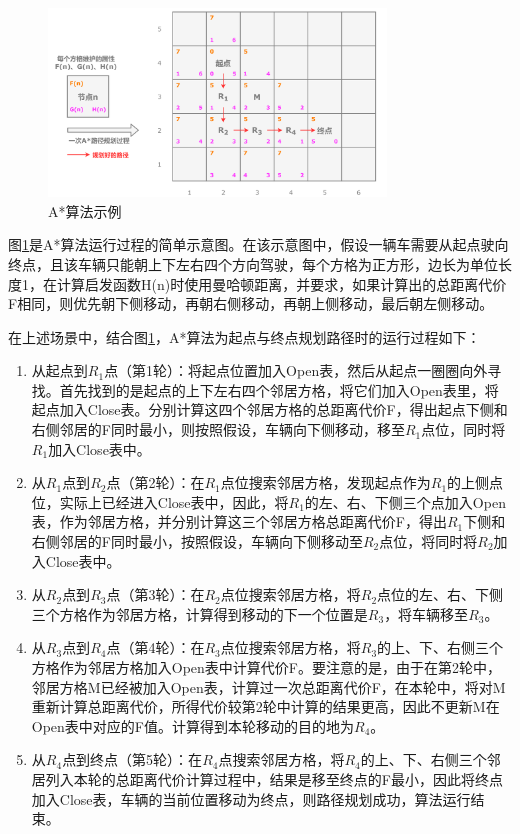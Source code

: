 \begin{figure}[!ht]
  \centering
  \includegraphics[width=0.8\textwidth]{undergraduate-thesis/images/Astar_Fn.png}
  \caption{A*算法示例}
  \label{AstarFn} %
\end{figure}

图\ref{AstarFn}是A*算法运行过程的简单示意图。在该示意图中，假设一辆车需要从起点驶向终点，且该车辆只能朝上下左右四个方向驾驶，每个方格为正方形，边长为单位长度1，在计算启发函数H(n)时使用曼哈顿距离，并要求，如果计算出的总距离代价F相同，则优先朝下侧移动，再朝右侧移动，再朝上侧移动，最后朝左侧移动。

在上述场景中，结合图\ref{AstarFn}，A*算法为起点与终点规划路径时的运行过程如下：

\begin{enumerate}
    \item 从起点到$R_1$点（第1轮）：将起点位置加入Open表，然后从起点一圈圈向外寻找。首先找到的是起点的上下左右四个邻居方格，将它们加入Open表里，将起点加入Close表。分别计算这四个邻居方格的总距离代价F，得出起点下侧和右侧邻居的F同时最小，则按照假设，车辆向下侧移动，移至$R_1$点位，同时将$R_1$加入Close表中。
    \item 从$R_1$点到$R_2$点（第2轮）：在$R_1$点位搜索邻居方格，发现起点作为$R_1$的上侧点位，实际上已经进入Close表中，因此，将$R_1$的左、右、下侧三个点加入Open表，作为邻居方格，并分别计算这三个邻居方格总距离代价F，得出$R_1$下侧和右侧邻居的F同时最小，按照假设，车辆向下侧移动至$R_2$点位，将同时将$R_2$加入Close表中。
    \item 从$R_2$点到$R_3$点（第3轮）：在$R_2$点位搜索邻居方格，将$R_2$点位的左、右、下侧三个方格作为邻居方格，计算得到移动的下一个位置是$R_3$，将车辆移至$R_3$。
    \item 从$R_3$点到$R_4$点（第4轮）：在$R_3$点位搜索邻居方格，将$R_3$的上、下、右侧三个方格作为邻居方格加入Open表中计算代价F。要注意的是，由于在第2轮中，邻居方格M已经被加入Open表，计算过一次总距离代价F，在本轮中，将对M重新计算总距离代价，所得代价较第2轮中计算的结果更高，因此不更新M在Open表中对应的F值。计算得到本轮移动的目的地为$R_4$。
    \item 从$R_4$点到终点（第5轮）：在$R_4$点搜索邻居方格，将$R_4$的上、下、右侧三个邻居列入本轮的总距离代价计算过程中，结果是移至终点的F最小，因此将终点加入Close表，车辆的当前位置移动为终点，则路径规划成功，算法运行结束。
\end{enumerate}

